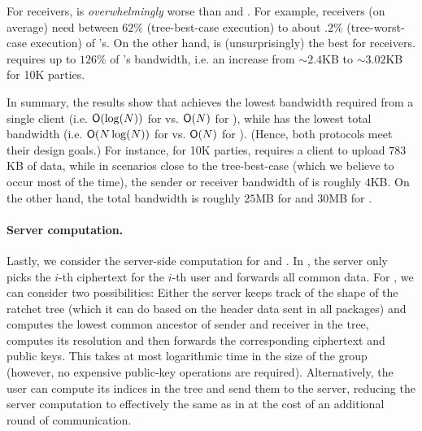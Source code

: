 For receivers, \protITK is \emph{overwhelmingly} worse than \saik and \protCMPKE. For
example, \saik receivers (on average) need between $62\%$ (tree-best-case execution) to about $.2\%$ (tree-worst-case execution)
of \protITK's. On the other hand, \protCMPKE is (unsurprisingly) the best for receivers.  \saik requires up to $126\%$
of \protCMPKE's bandwidth, i.e. an increase from $\sim 2.4$KB to $\sim 3.02$KB for 10K parties.

In summary, the results show that \saik achieves the lowest bandwidth required from a single client (i.e. $\textsf{O}(\log(N))$
for \saik vs. $\textsf{O}(N)$ for \protCMPKE), while \protCMPKE has the lowest total bandwidth (i.e. $\textsf{O}(N\log(N))$ for \saik
vs. $\textsf{O}(N)$ for \protCMPKE). (Hence, both protocols meet their design goals.) For instance, for 10K parties, \protCMPKE requires a client to upload $783$KB of data, while in scenarios close to the tree-best-case (which we believe to occur most of the time), the sender or receiver bandwidth of \saik is roughly $4$KB. On the other hand, the total bandwidth is roughly $25$MB for \protCMPKE and $30$MB for \saik.

\paragraph{Server computation.}
Lastly, we consider the server-side computation for \saik and \protCMPKE. In \protCMPKE, the server only picks the
$i$-th \mPKE ciphertext for the $i$-th user and forwards all common data. For \saik, we can consider two possibilities:
Either the server keeps track of the shape of the ratchet tree (which it can do based on the header data sent in all
packages) and computes the lowest common ancestor of sender and receiver in the tree, computes its resolution and then
forwards the corresponding ciphertext and public keys. This takes at most logarithmic time in the size of the
group (however, no expensive public-key operations are required). Alternatively, the user can compute its indices in the
tree and send them to the server, reducing the server computation to effectively the same as in \protCMPKE at the cost
of an additional round of communication.

